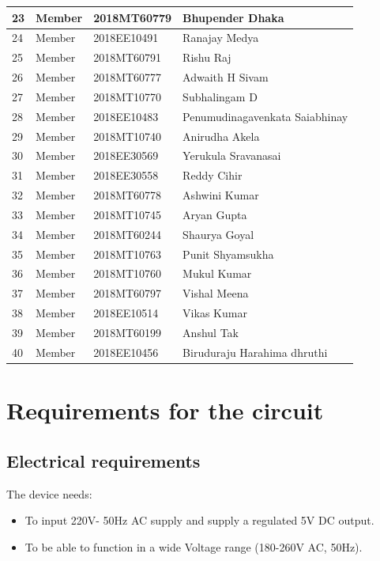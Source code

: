 \documentclass{article}
\begin{document}
\begin{tabular}{ |p{0.7cm}|p{5cm}|p{3.1cm}|p{6cm}|  }
23 & Member & 2018MT60779 & Bhupender Dhaka \\ \hline
24 & Member & 2018EE10491 & Ranajay Medya \\ \hline
25 & Member & 2018MT60791 & Rishu Raj \\ \hline
26 & Member & 2018MT60777 & Adwaith H Sivam \\ \hline
27 & Member & 2018MT10770 & Subhalingam D \\ \hline
28 & Member & 2018EE10483 & Penumudinagavenkata Saiabhinay \\ \hline
29 & Member & 2018MT10740 & Anirudha Akela \\ \hline
30 & Member	& 2018EE30569 & Yerukula Sravanasai \\ \hline
31 & Member	& 2018EE30558 & Reddy Cihir \\ \hline
32 & Member	& 2018MT60778 &	Ashwini Kumar \\ \hline
33 & Member	& 2018MT10745 & Aryan Gupta \\ \hline
34 & Member	& 2018MT60244 & Shaurya Goyal \\ \hline
35 & Member	& 2018MT10763 & Punit Shyamsukha \\ \hline
36 & Member	& 2018MT10760 & Mukul Kumar \\ \hline
37 & Member	& 2018MT60797 & Vishal Meena \\ \hline
38 & Member	& 2018EE10514 & Vikas Kumar \\ \hline
39 & Member	& 2018MT60199 & Anshul Tak \\ \hline
40 & Member	& 2018EE10456 & Biruduraju Harahima dhruthi  \\ \hline
\end{tabular}

\section{Requirements for the circuit}

\subsection{Electrical requirements}


The device needs:
\begin{itemize}
    \item To input 220V- 50Hz AC supply and supply a regulated 5V DC output. 
    \item To be able to function in a wide Voltage range (180-260V AC, 50Hz).
\end{itemize}
\end{document}

